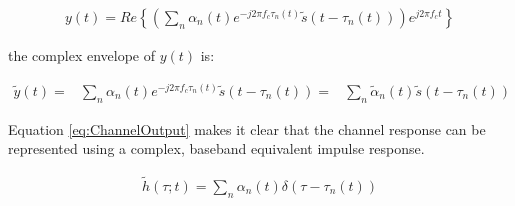 \begin{align}
	y(t) = Re\left\{\left( \sum_{n} %
	\alpha_{n}(t) e^{-j2 \pi f_{c} \tau_{n}(t)} %
	\tilde{s}(t - \tau_{n}(t)) \right)%
	e^{j 2\pi f_{c} t} \right\}
\end{align}

the complex envelope of $y(t)$ is:

\begin{align}
	\tilde{y}(t) =& \sum_{n}\alpha_{n}(t)%
	e^{-j 2\pi f_{c} \tau_{n}(t)} %
	\tilde{s}(t - \tau_{n}(t))
		     =& \sum_{n}%
	\tilde{\alpha}_{n}(t)\tilde{s}(%
	t-\tau_{n}(t))
	\label{eq:ChannelOutput}
\end{align}

Equation \ref{eq:ChannelOutput} makes it clear that %
the channel response can be represented using a %
complex, baseband equivalent impulse response.

\begin{align}
	\tilde{h}(\tau;t) = \sum_{n} %
	\alpha_{n}(t)\delta(\tau - %
	\tau_{n}(t))
\end{align}





